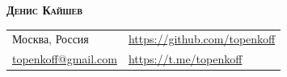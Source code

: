 \documentclass[a4paper]{article}
\begin{document}
\vspace*{-40pt}

\vspace*{-10pt}
\begin{center}
    \textbf{{\huge \scshape {Денис Кайшев}}}\\
    \vspace*{10pt}
    \begin{tabular}{l l}
        Москва, Россия & \url{https://github.com/topenkoff} \\
        \href{mailto:topenkoff@gmail.com}{topenkoff@gmail.com} & \url{https://t.me/topenkoff} \\
    \end{tabular}
    \vspace*{15pt}
\end{center}

\vspace{1mm}
\end{document}
